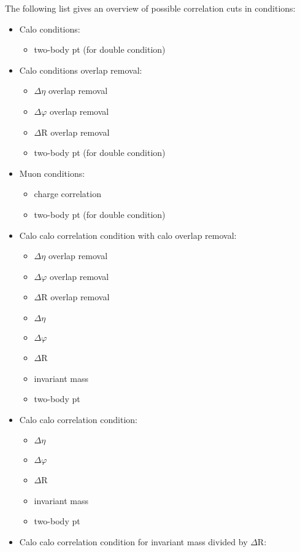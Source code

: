 The following list gives an overview of possible correlation cuts in conditions:

\begin{itemize}
\item Calo conditions:
\begin{itemize}
\item two-body pt (for double condition)
\end{itemize}
\item Calo conditions overlap removal:
\begin{itemize}
\item $\Delta\eta$ overlap removal
\item $\Delta\varphi$ overlap removal
\item $\Delta$R overlap removal
\item two-body pt (for double condition)
\end{itemize}
\item Muon conditions:
\begin{itemize}
\item charge correlation
\item two-body pt (for double condition)
\end{itemize}
\item Calo calo correlation condition with calo overlap removal:
\begin{itemize}
\item $\Delta\eta$ overlap removal
\item $\Delta\varphi$ overlap removal
\item $\Delta$R overlap removal
\item $\Delta\eta$
\item $\Delta\varphi$
\item $\Delta$R
\item invariant mass
\item two-body pt
\end{itemize}
\item Calo calo correlation condition:
\begin{itemize}
\item $\Delta\eta$
\item $\Delta\varphi$
\item $\Delta$R
\item invariant mass
\item two-body pt
\end{itemize}
\item Calo calo correlation condition for invariant mass divided by $\Delta$R:
\begin{itemize}

\end{itemize}
\end{itemize}

